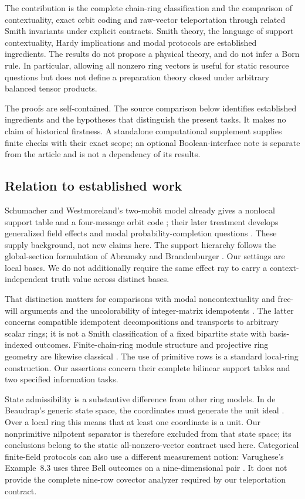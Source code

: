 \documentclass[11pt]{article}
\theoremstyle{definition}\newtheorem{definition}[theorem]{Definition}
\theoremstyle{remark}\newtheorem{remark}[theorem]{Remark}
\begin{document}
The contribution is the complete chain-ring classification and the comparison of contextuality, exact orbit coding and raw-vector teleportation through related Smith invariants under explicit contracts. Smith theory, the language of support contextuality, Hardy implications and modal protocols are established ingredients. The results do not propose a physical theory, and do not infer a Born rule. In particular, allowing all nonzero ring vectors is useful for static resource questions but does not define a preparation theory closed under arbitrary balanced tensor products.

The proofs are self-contained. The source comparison below identifies established ingredients and the hypotheses that distinguish the present tasks. It makes no claim of historical firstness. A standalone computational supplement supplies finite checks with their exact scope; an optional Boolean-interface note is separate from the article and is not a dependency of its results.

\subsection{Relation to established work}
Schumacher and Westmoreland's two-mobit model already gives a nonlocal support table and a four-message orbit code \cite{Schumacher2010}; their later treatment develops generalized field effects and modal probability-completion questions \cite{Schumacher2012}. These supply background, not new claims here. The support hierarchy follows the global-section formulation of Abramsky and Brandenburger \cite{AbramskyBrandenburger2011}. Our settings are local bases. We do not additionally require the same effect ray to carry a context-independent truth value across distinct bases.

That distinction matters for comparisons with modal noncontextuality and free-will arguments \cite{SchumacherFreeWill} and the uncolorability of integer-matrix idempotents \cite{BenZvi2017}. The latter concerns compatible idempotent decompositions and transports to arbitrary scalar rings; it is not a Smith classification of a fixed bipartite state with basis-indexed outcomes. Finite-chain-ring module structure and projective ring geometry are likewise classical \cite{HonoldLandjev2000,Byrne2021}. The use of primitive rows is a standard local-ring construction. Our assertions concern their complete bilinear support tables and two specified information tasks.

State admissibility is a substantive difference from other ring models. In de Beaudrap's generic state space, the coordinates must generate the unit ideal \cite{deBeaudrap2014}. Over a local ring this means that at least one coordinate is a unit. Our nonprimitive nilpotent separator is therefore excluded from that state space; its conclusions belong to the static all-nonzero-vector contract used here. Categorical finite-field protocols can also use a different measurement notion: Varughese's Example~8.3 uses three Bell outcomes on a nine-dimensional pair \cite{Varughese2009}. It does not provide the complete nine-row covector analyzer required by our teleportation contract.
\end{document}
